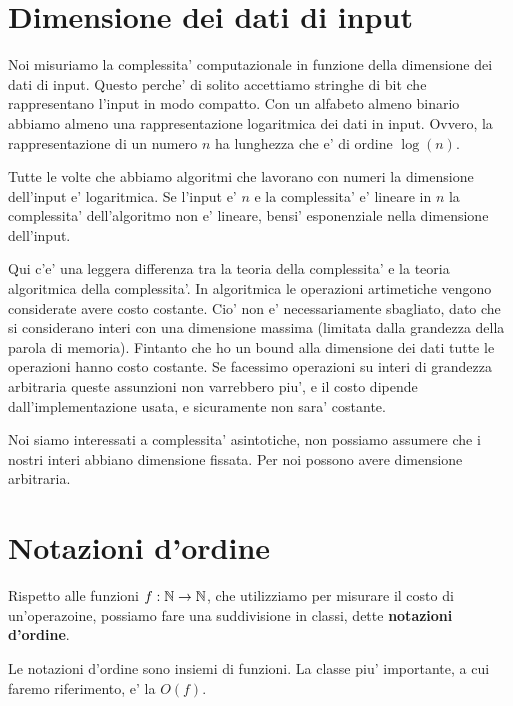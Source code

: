 \section{Dimensione dei dati di input}

Noi misuriamo la complessita' computazionale in funzione della dimensione dei dati di input. Questo
perche' di solito accettiamo stringhe di bit che rappresentano l'input in modo compatto. Con un
alfabeto almeno binario abbiamo almeno una rappresentazione logaritmica dei dati in input. Ovvero,
la rappresentazione di un numero $n$ ha lunghezza che e' di ordine $\log(n)$.

Tutte le volte che abbiamo algoritmi che lavorano con numeri la dimensione dell'input e'
logaritmica. Se l'input e' $n$ e la complessita' e' lineare in $n$ la complessita' dell'algoritmo
non e' lineare, bensi' esponenziale nella dimensione dell'input.

Qui c'e' una leggera differenza tra la teoria della complessita' e la teoria algoritmica della
complessita'. In algoritmica le operazioni artimetiche vengono considerate avere costo costante.
Cio' non e' necessariamente sbagliato, dato che si considerano interi con una dimensione massima
(limitata dalla grandezza della parola di memoria). Fintanto che ho un bound alla dimensione dei
dati tutte le operazioni hanno costo costante. Se facessimo operazioni su interi di grandezza
arbitraria queste assunzioni non varrebbero piu', e il costo dipende dall'implementazione usata, e
sicuramente non sara' costante.

Noi siamo interessati a complessita' asintotiche, non possiamo assumere che i nostri interi abbiano
dimensione fissata. Per noi possono avere dimensione arbitraria.

\section{Notazioni d'ordine}

Rispetto alle funzioni $f:\mathbb{N} \to \mathbb{N}$, che utilizziamo per misurare il costo di un'operazoine,
possiamo fare una suddivisione in classi, dette \textbf{notazioni d'ordine}.

Le notazioni d'ordine sono insiemi di funzioni. La classe piu' importante, a cui faremo riferimento,
e' la $O(f)$.


